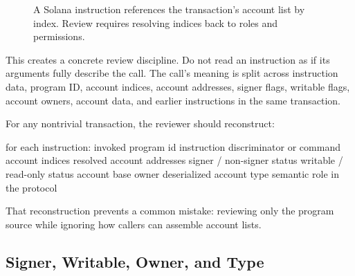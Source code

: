 \begin{figure}[htbp]
\centering
{}
\caption{A Solana instruction references the transaction's account list by index. Review requires resolving indices back to roles and permissions.}
\end{figure}

This creates a concrete review discipline. Do not read an instruction as if its arguments fully describe the call. The call's meaning is split across instruction data, program ID, account indices, account addresses, signer flags, writable flags, account owners, account data, and earlier instructions in the same transaction.

For any nontrivial transaction, the reviewer should reconstruct:

\begin{codeblock}
for each instruction:
    invoked program id
    instruction discriminator or command
    account indices
    resolved account addresses
    signer / non-signer status
    writable / read-only status
    account base owner
    deserialized account type
    semantic role in the protocol
\end{codeblock}

That reconstruction prevents a common mistake: reviewing only the program source while ignoring how callers can assemble account lists.

\subsection{Signer, Writable, Owner, and Type}

